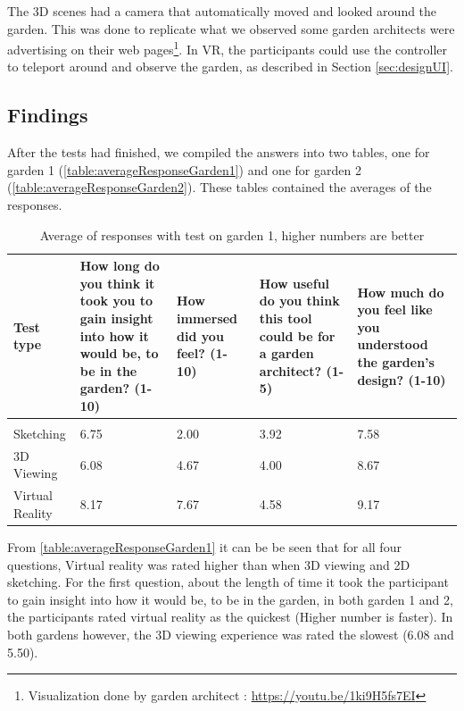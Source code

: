 The 3D scenes had a camera that automatically moved and looked around the garden. This was done to replicate what we observed some garden architects were advertising on their web pages\footnote{Visualization done by garden architect : \url{https://youtu.be/1ki9H5fs7EI}}. In VR, the participants could use the controller to teleport around and observe the garden, as described in Section \ref{sec:designUI}. 

\subsection{Findings}
After the tests had finished, we compiled the answers into two tables, one for garden 1 (\autoref{table:averageResponseGarden1}) and one for garden 2 (\autoref{table:averageResponseGarden2}). These tables contained the averages of the responses.
\begin{table}[H]
	\centering
	\caption{Average of responses with test on garden 1, higher numbers are better}
	\label{table:averageResponseGarden1}
	\begin{tabular}{p{3cm}|p{3cm}|p{2cm}|p{3cm}|p{3cm}}
		Test type       & How long do you think it took you to gain insight into how it would be, to be in the garden? (1-10) & How immersed did you feel? (1-10) & How useful do you think this tool could be for a garden architect? (1-5) & How much do you feel like you understood the garden's design? (1-10) \\ \hline
		&&&&\\
		Sketching       & 6.75    & 2.00    & 3.92      & 7.58            \\
		3D Viewing      & 6.08  & 4.67  & 4.00    & 8.67               \\
		Virtual Reality & 8.17     & 7.67     & 4.58      & 9.17    
	\end{tabular}
\end{table}
From \autoref{table:averageResponseGarden1} it can be be seen that for all four questions, Virtual reality was rated higher than when 3D viewing and 2D sketching. For the first question, about the length of time it took the participant to gain insight into how it would be, to be in the garden, in both garden 1 and 2, the participants rated virtual reality as the quickest (Higher number is faster). In both gardens however, the 3D viewing experience was rated the slowest (6.08 and 5.50).
